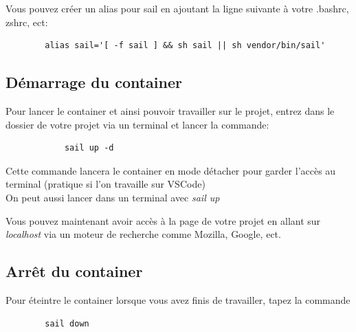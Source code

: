\documentclass[internal]{nhitec_design}
\begin{document}
    Vous pouvez créer un alias pour sail en ajoutant la ligne suivante à votre .bashrc, zshrc, ect: 

    \begin{lstlisting}
        alias sail='[ -f sail ] && sh sail || sh vendor/bin/sail'
    \end{lstlisting}
    
    \subsection[Démarrage du container]{Démarrage du container}
        Pour lancer le container et ainsi pouvoir travailler sur le projet, entrez dans le dossier de votre projet via un terminal et lancer la commande:
        
        \begin{lstlisting}
            sail up -d
        \end{lstlisting}

        Cette commande lancera le container en mode détacher pour garder l'accès au terminal (pratique si l'on travaille sur VSCode)\\
        \footnotesize{On peut aussi lancer dans un terminal avec \textit{sail up}}


        Vous pouvez maintenant avoir accès à la page de votre projet en allant sur \textit{localhost} via un moteur de recherche comme Mozilla, Google, ect.

    \subsection{Arrêt du container}

    Pour éteintre le container lorsque vous avez finis de travailler, tapez la commande

    \begin{lstlisting}
        sail down
    \end{lstlisting}
    
\end{document}
